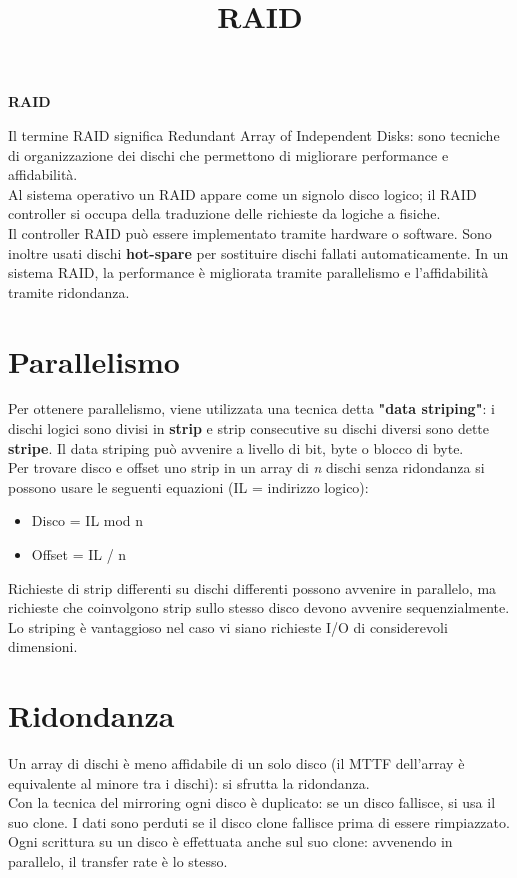 \documentclass[12pt]{article}
\title{RAID}
\begin{document}
\begin{center}
    \Huge\textbf{RAID}
\end{center}
Il termine RAID significa Redundant Array of Independent Disks: sono tecniche di organizzazione dei dischi che permettono di migliorare performance e affidabilità.\\
Al sistema operativo un RAID appare come un signolo disco logico; il RAID controller si occupa della traduzione delle richieste da logiche a fisiche.\\
Il controller RAID può essere implementato tramite hardware o software. Sono inoltre usati dischi \textbf{hot-spare} per sostituire dischi fallati automaticamente.
In un sistema RAID, la performance è migliorata tramite parallelismo e l'affidabilità tramite ridondanza.
\section*{Parallelismo}
Per ottenere parallelismo, viene utilizzata una tecnica detta \textbf{"data striping"}: i dischi logici sono divisi in \textbf{strip} e strip consecutive su dischi diversi sono dette \textbf{stripe}.
Il data striping può avvenire a livello di bit, byte o blocco di byte.\\
Per trovare disco e offset uno strip in un array di \textit{n} dischi senza ridondanza si possono usare le seguenti equazioni (IL = indirizzo logico):
\begin{itemize}
    \item Disco = IL mod n
    \item Offset = IL / n
\end{itemize}
Richieste di strip differenti su dischi differenti possono avvenire in parallelo, ma richieste che coinvolgono strip sullo stesso disco devono avvenire sequenzialmente.
Lo striping è vantaggioso nel caso vi siano richieste I/O di considerevoli dimensioni.\\
\section*{Ridondanza}
Un array di dischi è meno affidabile di un solo disco (il MTTF dell'array è equivalente al minore tra i dischi): si sfrutta la ridondanza.\\
Con la tecnica del mirroring ogni disco è duplicato: se un disco fallisce, si usa il suo clone. I dati sono perduti se il disco clone fallisce prima di essere rimpiazzato.
Ogni scrittura su un disco è effettuata anche sul suo clone: avvenendo in parallelo, il transfer rate è lo stesso.
\end{document}
